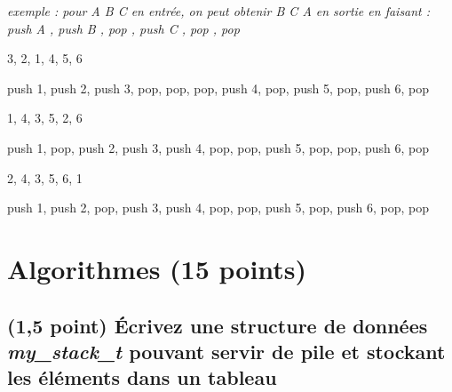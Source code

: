 \documentclass[11pt,a4paper]{article}
\begin{document}
\bigskip

\begin{center}
\noindent \textit{exemple : pour \og A B C \fg{} en entrée, on peut obtenir \og B C A \fg{} en sortie en faisant : \linebreak
\og push A \fg, \og push B \fg, \og pop \fg, \og push C \fg, \og pop \fg, \og pop \fg }
\end{center}

\medskip


\begin{center}

\begin{large}
3, 2, 1, 4, 5, 6
\end{large}

\begin{center}
 push 1, push 2, push 3, pop, pop, pop, push 4, pop, push 5, pop, push 6, pop
\end{center}


\begin{large}
1, 4, 3, 5, 2, 6
\end{large}

\begin{center}
 push 1, pop, push 2, push 3, push 4, pop, pop, push 5, pop, pop, push 6, pop
\end{center}


\begin{large}
2, 4, 3, 5, 6, 1
\end{large}

\begin{center}
 push 1, push 2, pop, push 3, push 4, pop, pop, push 5, pop, push 6, pop, pop
\end{center}

\end{center}

\vfillLast

%
\section{Algorithmes (15 points)}


\subsection{(1,5 point) \'Ecrivez une structure de données \og \textit{my\_stack\_t} \fg{} pouvant servir de pile et stockant les éléments dans un tableau }
\end{document}
